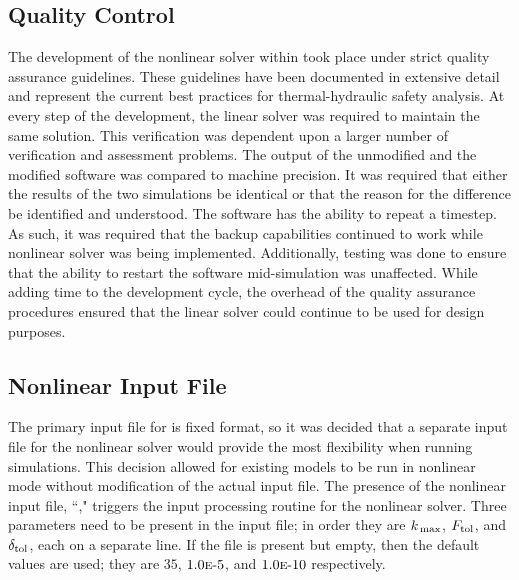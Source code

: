 \subsection{Quality Control}
\label{subsect:nlnDevelopment}
The development of the nonlinear solver within \cobra{} took place under strict quality assurance guidelines.
These guidelines have been documented in extensive detail \cite{Aumiller2013} and represent the current best practices for thermal-hydraulic safety analysis. 
At every step of the development, the linear solver was required to maintain the same solution.
This verification was dependent upon a larger number of verification and assessment problems.
The output of the unmodified \cobra{} and the modified \cobra{} software was compared to machine precision.
It was required that either the results of the two simulations be identical or that the reason for the difference be identified and understood.
The \cobra{} software has the ability to repeat a timestep.
As such, it was required that the backup capabilities continued to work while nonlinear solver was being implemented.
Additionally, testing was done to ensure that the ability to restart the software mid-simulation was unaffected.
While adding time to the development cycle, the overhead of the quality assurance procedures ensured that the linear solver could continue to be used for design purposes.

\subsection{Nonlinear Input File}
\label{subsect:nlnCobraInputFile}
The primary input file for \cobra{} is fixed format, so it was decided that a separate input file for the nonlinear solver would provide the most flexibility when running simulations.
This decision allowed for existing models to be run in nonlinear mode without modification of the actual input file.
The presence of the nonlinear input file, ``," triggers the input processing routine for the nonlinear solver.
Three parameters need to be present in the input file; in order they are $\kmax{}$, $\ftol{}$, and $\dtol{}$, each on a separate line. 
If the file is present but empty, then the default values are used; they are $35$, $\expneg{1.0}{5}$, and $\expneg{1.0}{10}$ respectively.

